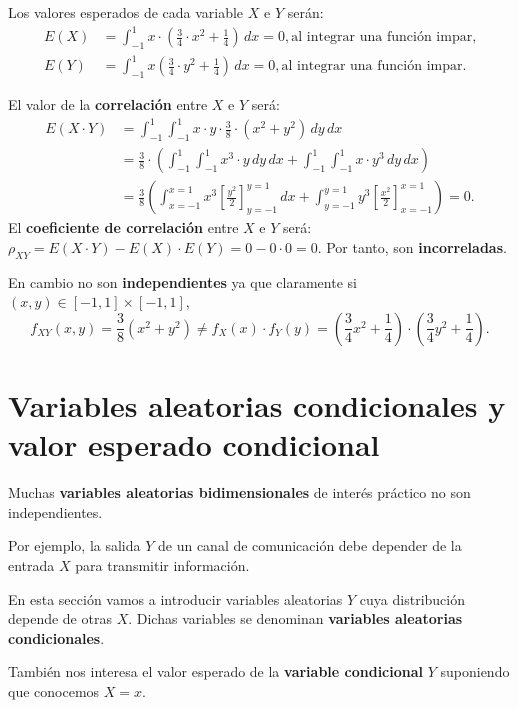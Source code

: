 \documentclass[]{book}
\begin{document}
Los valores esperados de cada variable \(X\) e \(Y\) serán:
\[
\begin{array}{rl}
E(X) & =\int_{-1}^1 x \cdot\left(\frac{3}{4} \cdot x^2+\frac{1}{4}\right)\, dx =0, \mbox{al integrar una función impar,}\\
E(Y) & =\int_{-1}^1 x \left(\frac{3}{4}\cdot y^2+\frac{1}{4}\right)\, dx =0, \mbox{al integrar una función impar.}
\end{array}
\]

El valor de la \textbf{correlación} entre \(X\) e \(Y\) será:
\[
\begin{array}{rl}
E(X\cdot Y) & =\int_{-1}^1\int_{-1}^1 x \cdot y \cdot \frac{3}{8}\cdot (x^2+y^2)\, dy\, dx\\ & =\frac{3}{8}\cdot\left(\int_{-1}^1\int_{-1}^1 x^3 \cdot y\, dy \, dx+\int_{-1}^1\int_{-1}^1 x\cdot y^3\, dy \, dx\right) \\ & = \frac{3}{8} \left(\int_{x=-1}^{x=1}x^3 \left[\frac{y^2}{2}\right]_{y=-1}^{y=1}\, dx + \int_{y=-1}^{y=1}y^3 \left[\frac{x^2}{2}\right]_{x=-1}^{x=1}\right)=0.
\end{array}
\]
El \textbf{coeficiente de correlación} entre \(X\) e \(Y\) será: \(\rho_{XY}=E(X\cdot Y)-E(X)\cdot E(Y)=0-0\cdot 0=0\). Por tanto, son \textbf{incorreladas}.

En cambio no son \textbf{independientes} ya que claramente si \((x,y)\in [-1,1]\times [-1,1]\),
\[
f_{XY}(x,y)=\frac{3}{8}(x^2+y^2) \neq f_X(x)\cdot f_Y(y)=\left(\frac{3}{4} x^2+\frac{1}{4}\right)\cdot \left(\frac{3}{4} y^2+\frac{1}{4}\right).
\]

\hypertarget{variables-aleatorias-condicionales-y-valor-esperado-condicional}{%
\section{Variables aleatorias condicionales y valor esperado condicional}\label{variables-aleatorias-condicionales-y-valor-esperado-condicional}}

Muchas \textbf{variables aleatorias bidimensionales} de interés práctico no son independientes.

Por ejemplo, la salida \(Y\) de un canal de comunicación debe depender de la entrada \(X\) para transmitir información.

En esta sección vamos a introducir variables aleatorias \(Y\) cuya distribución depende de otras \(X\). Dichas variables se denominan \textbf{variables aleatorias condicionales}.

También nos interesa el valor esperado de la \textbf{variable condicional} \(Y\) suponiendo que conocemos \(X=x\).
\end{document}
